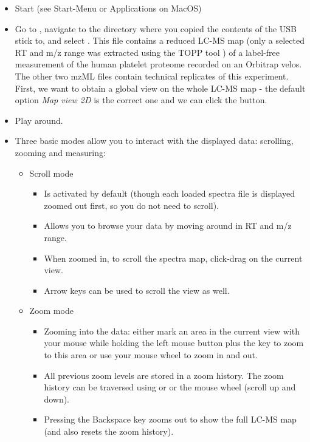 \begin{itemize}
\item Start  (see Start-Menu or Applications on MacOS)
\item Go to , navigate to the directory where you copied the contents of the USB stick to,
      and select
      . This file contains a reduced LC-MS map (only a selected RT and m/z range
      was extracted using the TOPP tool ) of a label-free measurement of the human platelet proteome recorded on an Orbitrap velos.
      The other two mzML files contain technical replicates of this experiment.
      First, we want to obtain a global view on the whole LC-MS map - the default option \textit{Map view 2D} is the correct one and we can click the  button. 
\item Play around.
\item Three basic modes allow you to interact with the displayed data: scrolling, zooming and measuring:
    \begin{itemize}
    \item Scroll mode
        \begin{itemize}
        \item Is activated by default (though each loaded spectra file is displayed zoomed out first, so you do not need to scroll).
        \item Allows you to browse your data by moving around in RT and m/z range.
        \item When zoomed in, to scroll the spectra map, click-drag on the current view.
        \item Arrow keys can be used to scroll the view as well.
        \end{itemize}
    \item Zoom mode
        \begin{itemize}
        \item Zooming into the data: either mark an area in the current view with your mouse while holding the left mouse
              button plus the \keys{\ctrl} key to zoom to this area
              or use your mouse wheel to zoom in and out.
        \item All previous zoom levels are stored in a zoom history. The zoom history can be traversed using
              \keys[,]{\ctrl,+} or \keys[,]{\ctrl,-} or the mouse wheel (scroll up and down).
        \item Pressing the Backspace key zooms out to show the full LC-MS map (and also resets the zoom history).

\end{itemize}
\end{itemize}
\end{itemize}
